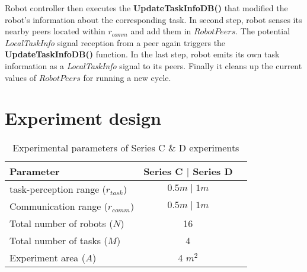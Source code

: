 Robot controller then executes the \textbf{UpdateTaskInfoDB()} that modified the robot's information about the corresponding task. In second step, robot senses its nearby peers located within $r_{comm}$ and add them in $RobotPeers$. The potential \textit{LocalTaskInfo} signal reception from a  peer again triggers the \textbf{UpdateTaskInfoDB()} function. In the last step, robot emits its own task information as a \textit{LocalTaskInfo} signal to its peers. Finally it cleans up the current values of $RobotPeers$ for running a new cycle.
%
\section{Experiment design}
\label{local-comm:expt-design}
%
\begin{table}[H]
\caption{Experimental parameters of Series C \& D experiments}
\label{table:expt-design}
\begin{center}
\begin{tabular}{|l|c|c|}
\hline Parameter & \hspace*{0.2cm} Series C $\mid$ Series D\\
\hline task-perception range ($r_{task}$) & $0.5 m \mid 1 m$\\
\hline Communication range ($r_{comm}$) & $0.5 m \mid 1 m$\\
\hline Total number of robots ($N$) & 16 \\
\hline Total number of tasks ($M$) & 4 \\
\hline Experiment area ($A$) & 4 $m^2$\\
\hline
\end{tabular}
\end{center}
\end{table}
